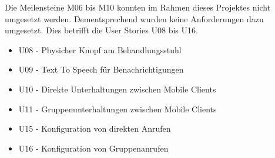 Die Meilensteine M06 bis M10 konnten im Rahmen dieses Projektes nicht umgesetzt werden.
Dementsprechend wurden keine Anforderungen dazu umgesetzt.
Dies betrifft die User Stories U08 bis U16.

\begin{itemize}
    \item U08 - Physicher Knopf am Behandlungsstuhl
    \item U09 - Text To Speech für Benachrichtigungen
    \item U10 - Direkte Unterhaltungen zwischen Mobile Clients
    \item U11 - Gruppenunterhaltungen zwischen Mobile Clients
    \item U15 - Konfiguration von direkten Anrufen
    \item U16 - Konfiguration von Gruppenanrufen
\end{itemize}

\clearpage
